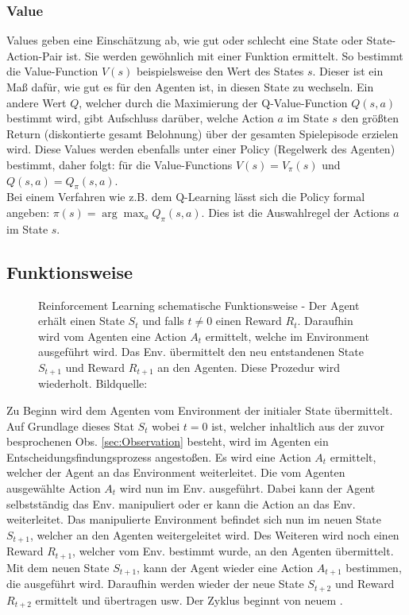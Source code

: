 \subsubsection{Value}
Values geben eine Einschätzung ab, wie gut oder schlecht eine State oder State-Action-Pair ist. Sie werden gewöhnlich mit einer Funktion ermittelt. So bestimmt die Value-Function $V(s)$ beispielsweise den Wert des States $s$. Dieser ist ein Maß dafür, wie gut es für den Agenten ist, in diesen State zu wechseln. Ein andere Wert $Q$, welcher durch die Maximierung der Q-Value-Function $Q(s,a)$ bestimmt wird, gibt Aufschluss darüber, welche Action $a$ im State $s$ den größten Return (diskontierte gesamt Belohnung) über der gesamten Spielepisode erzielen wird.
Diese Values werden ebenfalls unter einer Policy (Regelwerk des Agenten) bestimmt, daher folgt: für die Value-Functions $V(s) = V_\pi(s)$ und
$Q(s,a) = Q_\pi(s,a)$. \cite[S. 46]{Sutton1998} \\
Bei einem Verfahren wie z.B. dem Q-Learning lässt sich die Policy formal angeben: $\pi(s) = \arg\max_{a} Q_\pi(s,a)$. Dies ist die Auswahlregel der Actions $a$ im State $s$. \cite[S.291]{DRL_Lapan}

\subsection{Funktionsweise} \label{sec:Funktionsweise}
\begin{figure}[H]
	\centering
	\def\svgscale{1.0}
	
	\caption[Reinforcement Learning]{Reinforcement Learning schematische Funktionsweise - Der Agent erhält einen State $S_{t}$ und falls 
		$t \neq 0$ einen Reward $R_{t}$. Daraufhin wird vom Agenten eine Action $A_{t}$ ermittelt, welche im Environment ausgeführt wird. Das Env. übermittelt den neu entstandenen State $S_{t+1}$ und Reward $R_{t+1}$ an den Agenten. Diese Prozedur wird wiederholt. Bildquelle:
	\cite[S. 38]{Sutton1998}}
	\label{fig:Reinforcement Learning}
\end{figure}
Zu Beginn wird dem Agenten vom Environment der initialer State übermittelt. Auf Grundlage dieses Stat $S_{t}$ wobei $t=0$ ist, welcher inhaltlich aus der zuvor besprochenen Obs. \ref{sec:Observation} besteht, wird im Agenten ein Entscheidungsfindungsprozess angestoßen. Es wird eine Action $A_{t}$ ermittelt, welcher der Agent an das Environment weiterleitet. Die vom Agenten ausgewählte Action $A_{t}$ wird nun im Env. ausgeführt. Dabei kann der Agent selbstständig das Env. manipuliert oder er kann die Action an das Env. weiterleitet.
Das manipulierte Environment befindet sich nun im neuen State $S_{t+1}$, welcher an den Agenten weitergeleitet wird. Des Weiteren wird noch einen Reward $R_{t+1}$, welcher vom Env. bestimmt wurde, an den Agenten übermittelt.\\ 
Mit dem neuen State $S_{t+1}$, kann der Agent wieder eine Action $A_{t+1}$ bestimmen, die ausgeführt wird. Daraufhin werden wieder der neue State $S_{t+2}$ und Reward $R_{t+2}$ ermittelt und übertragen usw. Der Zyklus beginnt von neuem \cite[S. 37 ff.]{Sutton1998}.

